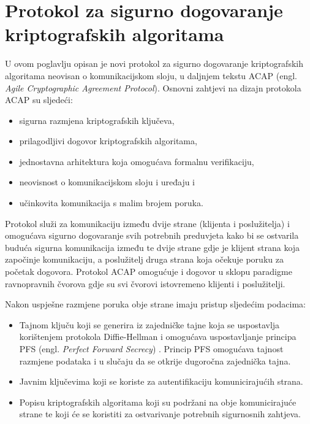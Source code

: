 \chapter{Protokol za sigurno dogovaranje kriptografskih algoritama}
\label{ch:model}

U ovom poglavlju opisan je novi protokol za sigurno dogovaranje
kriptografskih algoritama neovisan o komunikacijskom sloju, u daljnjem tekstu
ACAP (engl. \emph{Agile Cryptographic Agreement Protocol}). 
Osnovni zahtjevi na dizajn protokola ACAP su sljedeći:
\begin{itemize}
    \item sigurna razmjena kriptografskih ključeva,
    \item prilagodljivi dogovor kriptografskih algoritama,
    \item jednostavna arhitektura koja omogućava formalnu verifikaciju,
    \item neovisnost o komunikacijskom sloju i uređaju i
    \item učinkovita komunikacija s malim brojem poruka.
\end{itemize}

Protokol služi za komunikaciju između dvije strane (klijenta i poslužitelja) i
omogućava sigurno dogovaranje svih potrebnih preduvjeta kako bi se ostvarila buduća
sigurna komunikacija između te dvije strane gdje je klijent strana koja
započinje komunikaciju, a poslužitelj druga strana koja očekuje poruku za
početak dogovora. Protokol ACAP omogućuje i dogovor u sklopu paradigme
ravnopravnih čvorova gdje su svi čvorovi istovremeno klijenti i poslužitelji.

Nakon uspješne razmjene poruka obje strane imaju pristup sljedećim
podacima:
\begin{itemize}
    \item Tajnom ključu koji se generira iz zajedničke tajne koja se uspostavlja
	korištenjem protokola Diffie-Hellman \cite{DH}
	i omogućava uspostavljanje principa PFS (engl. \emph{Perfect Forward
	Secrecy}) \cite{krawczyk2011perfect}. Princip PFS omogućava tajnost
	razmjene podataka i u slučaju da se otkrije dugoročna zajednička tajna.
    \item Javnim ključevima koji se koriste za autentifikaciju komunicirajućih
	strana.
    \item Popisu kriptografskih algoritama koji su podržani na obje
	komunicirajuće strane te koji će se koristiti za ostvarivanje potrebnih
	sigurnosnih zahtjeva.
\end{itemize}


